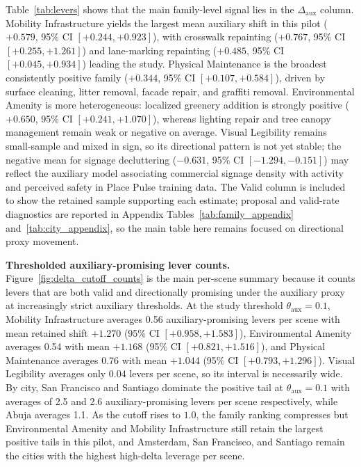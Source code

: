 Table~\ref{tab:levers} shows that the main family-level signal lies in
the $\Delta_{\mathrm{aux}}$ column. Mobility Infrastructure yields the
largest mean auxiliary shift in this pilot ($+0.579$, 95\% CI $[+0.244, +0.923]$),
with crosswalk repainting ($+0.767$, 95\% CI $[+0.255, +1.261]$) and
lane-marking repainting ($+0.485$, 95\% CI $[+0.045, +0.934]$) leading
the study. Physical Maintenance is the broadest consistently positive
family ($+0.344$, 95\% CI $[+0.107, +0.584]$), driven by surface
cleaning, litter removal, facade repair, and graffiti removal.
Environmental Amenity is more heterogeneous: localized greenery
addition is strongly positive ($+0.650$, 95\% CI $[+0.241, +1.070]$),
whereas lighting repair and tree canopy management remain weak or
negative on average. Visual Legibility remains small-sample and mixed
in sign, so its directional pattern is not yet stable; the negative mean
for signage decluttering ($-0.631$, 95\% CI $[-1.294, -0.151]$) may
reflect the auxiliary model associating commercial signage density with
activity and perceived safety in Place Pulse training data. The Valid
column is included to show the retained sample supporting each estimate;
proposal and valid-rate diagnostics are reported in
Appendix Tables~\ref{tab:family_appendix} and~\ref{tab:city_appendix},
so the main table here remains focused on directional proxy movement.

\noindent\textbf{Thresholded auxiliary-promising lever counts.}
Figure~\ref{fig:delta_cutoff_counts} is the main per-scene summary
because it counts levers that are both valid and directionally
promising under the auxiliary proxy at increasingly strict auxiliary thresholds. At the study
threshold $\theta_{\mathrm{aux}}{=}0.1$, Mobility Infrastructure
averages 0.56 auxiliary-promising levers per scene with mean retained shift
$+1.270$ (95\% CI $[+0.958, +1.583]$), Environmental Amenity averages
0.54 with mean $+1.168$ (95\% CI $[+0.821, +1.516]$), and
Physical Maintenance averages 0.76 with mean $+1.044$ (95\% CI
$[+0.793, +1.296]$). Visual Legibility averages only 0.04 levers per
scene, so its interval is necessarily wide. By city, San Francisco and
Santiago dominate the positive tail at $\theta_{\mathrm{aux}}{=}0.1$
with averages of 2.5 and 2.6 auxiliary-promising levers per scene respectively,
while Abuja averages 1.1. As the cutoff rises to $1.0$, the family
ranking compresses but Environmental Amenity and Mobility
Infrastructure still retain the largest positive tails in this pilot, and
Amsterdam, San Francisco, and Santiago remain the cities with the
highest high-delta leverage per scene.

